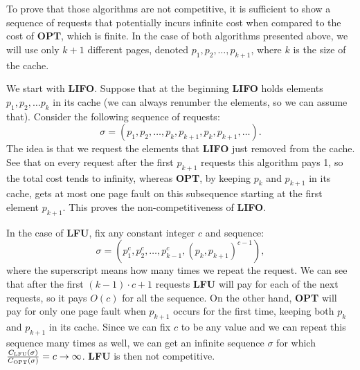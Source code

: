 To prove that those algorithms are not competitive, it is sufficient to show a sequence 
of requests that potentially incurs infinite cost when compared to the cost of 
\textbf{OPT}, which is finite. In the case of both algorithms presented above, we 
will use only 
$k+1$ different pages, denoted $p_1, p_2, \ldots, p_{k+1}$, where $k$ is the 
size of the cache.

We start with \textbf{LIFO}. Suppose that at the beginning \textbf{LIFO} holds
elements $p_1, p_2, \ldots p_k$ in its cache (we can always renumber the 
elements, so we can 
assume that). Consider the following sequence of requests:
$$ \sigma = (p_1, p_2, \ldots, p_k, p_{k+1}, p_k, p_{k+1}, \ldots).$$
The idea is that we request the elements that \textbf{LIFO} just removed from the 
cache. See that on every request after the first $p_{k+1}$ requests this algorithm pays 1, 
so the total cost tends to infinity, whereas \textbf{OPT}, by keeping $p_k$ 
and $p_{k+1}$ in its cache, gets at most one page fault on this subsequence starting at the first element $p_{k+1}$. 
This proves the non-competitiveness of \textbf{LIFO}.

In the case of \textbf{LFU}, fix any constant integer $c$ and sequence:
$$\sigma = (p_1^c, p_2^c, \ldots, p_{k-1}^c, (p_k, p_{k+1})^{c-1}),$$
where the superscript means how many times we repeat the request. We can see that 
after the first $(k-1) \cdot c + 1$ requests \textbf{LFU} will pay for each of the 
next requests, so it pays $O(c)$ for all the sequence. On the other hand, 
\textbf{OPT} will pay for only one page fault when $p_{k+1}$ occurs for the 
first time, keeping both $p_k$ and $p_{k+1}$ in its cache. Since we can fix $c$ to be any value and we can repeat this 
sequence many times as well, we can get an infinite sequence $\sigma$ for which 
$\frac{C_{\mathrm{LFU}}(\sigma)}{C_{\mathrm{OPT}}(\sigma)} = c \rightarrow \infty$. 
\textbf{LFU} is then not competitive.
